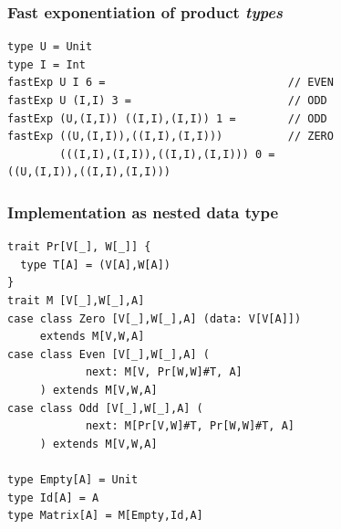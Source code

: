 \documentclass[14pt,t,usepdftitle=false,
xcolornames=x11names,svgnames,dvipsnames]{beamer}
\begin{document}
\begin{frame}[fragile]
  \frametitle{Fast exponentiation of product \emph{types}}
\begin{lstlisting}[style=scalarepl,moreemph={U,I}]
type U = Unit
type I = Int
fastExp U I 6 =                            // EVEN
fastExp U (I,I) 3 =                        // ODD
fastExp (U,(I,I)) ((I,I),(I,I)) 1 =        // ODD
fastExp ((U,(I,I)),((I,I),(I,I)))          // ZERO
        (((I,I),(I,I)),((I,I),(I,I))) 0 = 
((U,(I,I)),((I,I),(I,I)))
\end{lstlisting}
\end{frame}

\begin{frame}[fragile]
  \frametitle{Implementation as nested data type}
\begin{lstlisting}[style=scala]
trait Pr[V[_], W[_]] {
  type T[A] = (V[A],W[A])
}
trait M [V[_],W[_],A]
case class Zero [V[_],W[_],A] (data: V[V[A]])
     extends M[V,W,A]
case class Even [V[_],W[_],A] (
            next: M[V, Pr[W,W]#T, A]
     ) extends M[V,W,A]
case class Odd [V[_],W[_],A] (
            next: M[Pr[V,W]#T, Pr[W,W]#T, A]
     ) extends M[V,W,A]

type Empty[A] = Unit
type Id[A] = A
type Matrix[A] = M[Empty,Id,A]
\end{lstlisting}
  
\end{frame}
\end{document}

